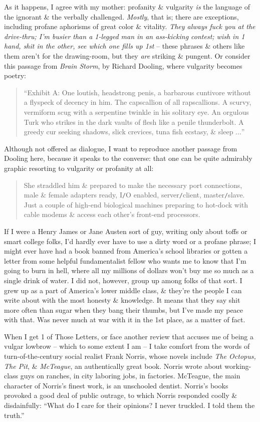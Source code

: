 \documentclass{article}
\numberwithin{equation}{section}
\begin{document}
As it happens, I agree with my mother: profanity \& vulgarity \textit{is} the language of the ignorant \& the verbally challenged. \textit{Mostly}, that is; there are exceptions, including profane aphorisms of great color \& vitality. \textit{They always fuck you at the drive-thru; I'm busier than a 1-legged man in an ass-kicking contest; wish in 1 hand, shit in the other, see which one fills up 1st} -- these phrases \& others like them aren't for the drawing-room, but they \textit{are} striking \& pungent. Or consider this passage from \textit{Brain Storm}, by Richard Dooling, where vulgarity becomes poetry:
\begin{quotation}
	``Exhibit A: One loutish, headstrong penis, a barbarous cuntivore without a flyspeck of decency in him. The capscallion of all rapscallions. A scurvy, vermiform scug with a serpentine twinkle in his solitary eye. An orgulous Turk who strikes in the dark vaults of flesh like a penile thunderbolt. A greedy cur seeking shadows, slick crevices, tuna fish ecstasy, \& sleep $\ldots$''
\end{quotation}
Although not offered as dialogue, I want to reproduce another passage from Dooling here, because it speaks to the converse: that one can be quite admirably graphic resorting to vulgarity or profanity at all:
\begin{quotation}
	She straddled him \& prepared to make the necessary port connections, male \& female adapters ready, I{\tt/}O enabled, server{\tt/}client, master{\tt/}slave. Just a couple of high-end biological machines preparing to hot-dock with cable modems \& access each other's front-end processors.
\end{quotation}
If I were a Henry James or Jane Austen sort of guy, writing only about toffs or smart college folks, I'd hardly ever have to use a dirty word or a profane phrase; I might ever have had a book banned from America's school libraries or gotten a letter from some helpful fundamentalist fellow who wants me to know that I'm going to burn in hell, where all my millions of dollars won't buy me so much as a single drink of water. I did not, however, group up among folks of that sort. I grew up as a part of America's lower middle class, \& they're the people I can write about with the most honesty \& knowledge. It means that they say shit more often than sugar when they bang their thumbs, but I've made my peace with that. Was never much at war with it in the 1st place, as a matter of fact.

When I get 1 of Those Letters, or face another review that accuses me of being a vulgar lowbrow -- which to some extent I am -- I take comfort from the words of turn-of-the-century social realist Frank Norris, whose novels include \textit{The Octopus, The Pit}, \& \textit{McTeague}, an authentically great book. Norris wrote about working-class guys on ranches, in city laboring jobs, in factories. McTeague, the main character of Norris's finest work, is an unschooled dentist. Norris's books provoked a good deal of public outrage, to which Norris responded coolly \& disdainfully: ``What do I care for their opinions? I never truckled. I told them the truth.''
\end{document}
